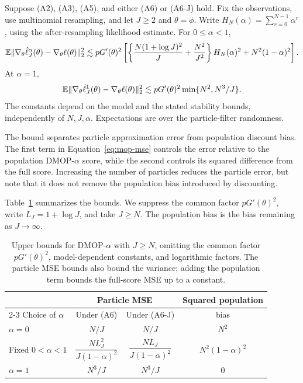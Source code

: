 \documentclass[11pt]{article}
\begin{document}
\begin{thm}
\label{thm:mop-biasvar}
Suppose (A2), (A3), (A5), and either (A6) or (A6-J) hold.
Fix the observations, use multinomial resampling, and let $J\geq2$ and $\theta=\phi$.
Write $H_N(\alpha)=\sum_{r=0}^{N-1}\alpha^r$,
using the after-resampling likelihood estimate.
For $0\leq\alpha<1$,
\begin{equation}
\label{eq:mop-mse}
\mathbb{E}\|\nabla_\theta\hat\ell_J^\alpha(\theta)-\nabla_\theta\ell(\theta)\|_2^2
\lesssim pG'(\theta)^2
\left[
\left\{\frac{N(1+\log J)^2}{J}+\frac{N^2}{J^2}\right\}
H_N(\alpha)^2+N^2(1-\alpha)^2
\right].
\end{equation}
At $\alpha=1$,
\begin{equation}
\label{eq:mop-one-mse}
\mathbb{E}\|\nabla_\theta\hat\ell_J^1(\theta)-\nabla_\theta\ell(\theta)\|_2^2
\lesssim pG'(\theta)^2\min\{N^2,N^3/J\}.
\end{equation}
The constants depend on the model and the stated stability bounds, independently of $N,J,\alpha$.
Expectations are over the particle-filter randomness.
\end{thm}

The bound separates particle approximation error from population discount bias.
The first term in Equation~\ref{eq:mop-mse} controls the error relative to the population DMOP-$\alpha$ score, while the second controls its squared difference from the full score.
Increasing the number of particles reduces the particle error, but note that it does not remove the population bias introduced by discounting.

Table~\ref{tab:dmop-error-bounds} summarizes the bounds.
We suppress the common factor $pG'(\theta)^2$, write $L_J=1+\log J$, and take $J\geq N$.
The population bias is the bias remaining as $J\to\infty$.

\begin{table}[htbp!]
\centering
\begin{tabular}{@{}lccc@{}}
\toprule
& \multicolumn{2}{c}{Particle MSE} & Squared population \\
\cmidrule(lr){2-3}
Choice of $\alpha$ & Under (A6) & Under (A6-J) & bias \\
\midrule
$\alpha=0$ & $N/J$ & $N/J$ & $N^2$ \\
Fixed $0<\alpha<1$ & $\dfrac{NL_J^2}{J(1-\alpha)^2}$
& $\dfrac{NL_J}{J(1-\alpha)^2}$ & $N^2(1-\alpha)^2$ \\[8pt]
$\alpha=1$ & $N^3/J$ & $N^3/J$ & $0$ \\
\bottomrule
\end{tabular}
\caption{Upper bounds for DMOP-$\alpha$ with $J\geq N$, omitting the common factor $pG'(\theta)^2$, model-dependent constants, and logarithmic factors.
The particle MSE bounds also bound the variance; adding the population term bounds the full-score MSE up to a constant.}
\label{tab:dmop-error-bounds}
\end{table}
\end{document}
